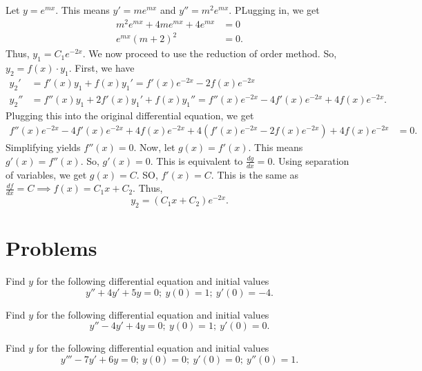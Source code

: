 \begin{soln}
    Let $y=e^{mx}$. This means $y'=me^{mx}$ and $y''=m^2e^{mx}$. PLugging in, 
    we get
    \begin{align*}
        m^2e^{mx}+4me^{mx}+4e^{mx} &= 0 \\
        e^{mx}(m+2)^2 &= 0.
    \end{align*}
    Thus, $\boxed{y_1 = C_1e^{-2x}}$. We now proceed to use the  \alert{reduction of order} 
    method.
    So, $y_2 = f(x)\cdot y_1$. First, we have 
    \begin{align*}
        y_2' &= f'(x)y_1+f(x)y_1' = f'(x)e^{-2x}-2f(x)e^{-2x}\\
        y_2'' &= f''(x)y_1+2f'(x)y_1'+f(x)y_1'' = f''(x)e^{-2x}-4f'(x)e^{-2x}+4f(x)e^{-2x}.
    \end{align*}
    Plugging this into the original differential equation, we get
    \begin{align*}
        f''(x)e^{-2x}-4f'(x)e^{-2x}+4f(x)e^{-2x} + 4\left(f'(x)e^{-2x}-2f(x)e^{-2x} \right)
        + 4f(x)e^{-2x} &= 0.
    \end{align*}
    Simplifying yields $f''(x) = 0$. Now, let $g(x) = f'(x)$. This means
    $g'(x) = f''(x)$. So, $g'(x) = 0$. This is equivalent to $\frac{dg}{dx} = 0$.
    Using separation of variables, we get $g(x) = C$. SO, $f'(x) = C$. This is
    the same as $\frac{df}{dx} = C \implies f(x) = C_1x+C_2$. Thus,
    $$\boxed{y_2 = \left(C_1x+C_2\right)e^{-2x}}.$$
\end{soln}

\section{Problems}
\begin{problem}
    Find $y$ for the following differential equation and initial values
    $$y''+4y'+5y = 0; ~ y(0) = 1; ~ y'(0) = -4.$$
\end{problem}
\begin{problem}
    Find $y$ for the following differential equation and initial values
    $$y''- 4y'+4y = 0; ~ y(0) = 1; ~ y'(0) = 0.$$
\end{problem}
\begin{problem}
    Find $y$ for the following differential equation and initial values
    $$y'''-7y'+6y = 0; ~ y(0) = 0; ~ y'(0) = 0; ~ y''(0) = 1.$$
\end{problem}
